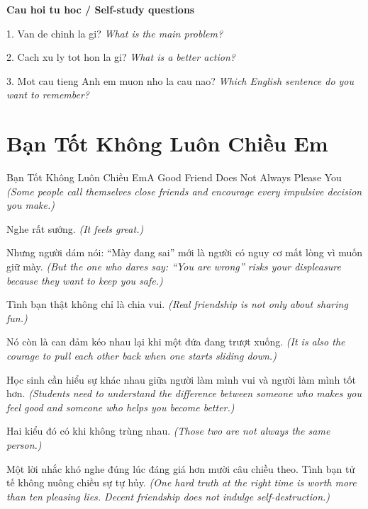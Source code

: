 \begin{tuhocnhanh}
\textbf{Cau hoi tu hoc / Self-study questions}

1. Van de chinh la gi? \textit{What is the main problem?}

2. Cach xu ly tot hon la gi? \textit{What is a better action?}

3. Mot cau tieng Anh em muon nho la cau nao? \textit{Which English sentence do you want to remember?}
\end{tuhocnhanh}
\ngancach

\section{Bạn Tốt Không Luôn Chiều Em}
\begin{truyen}{Bạn Tốt Không Luôn Chiều Em}{A Good Friend Does Not Always Please You}
\textit{(Some people call themselves close friends and encourage every impulsive decision you make.)}

Nghe rất sướng.
\textit{(It feels great.)}

Nhưng người dám nói: ``Mày đang sai'' mới là người có nguy cơ mất lòng vì muốn giữ mày.
\textit{(But the one who dares say: ``You are wrong'' risks your displeasure because they want to keep you safe.)}

Tình bạn thật không chỉ là chia vui.
\textit{(Real friendship is not only about sharing fun.)}

Nó còn là can đảm kéo nhau lại khi một đứa đang trượt xuống.
\textit{(It is also the courage to pull each other back when one starts sliding down.)}

Học sinh cần hiểu sự khác nhau giữa người làm mình vui và người làm mình tốt hơn.
\textit{(Students need to understand the difference between someone who makes you feel good and someone who helps you become better.)}

Hai kiểu đó có khi không trùng nhau.
\textit{(Those two are not always the same person.)}

\end{truyen}

\begin{baihoc}
Một lời nhắc khó nghe đúng lúc đáng giá hơn mười câu chiều theo. Tình bạn tử tế không nuông chiều sự tự hủy.
\textit{(One hard truth at the right time is worth more than ten pleasing lies. Decent friendship does not indulge self-destruction.)}
\end{baihoc}

